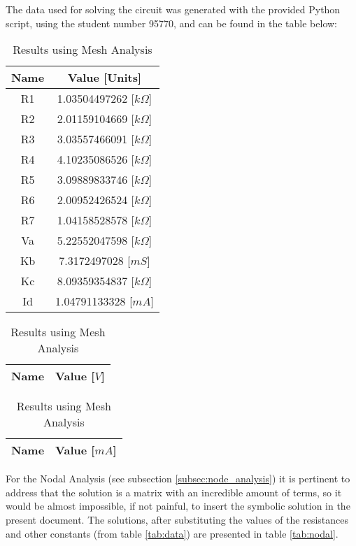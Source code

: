 The data used for solving the circuit was generated with the provided Python script, using the student number 95770, and can be found in the table below:
\begin{table}[h]
\parbox{.36\linewidth}{
  \centering
  \begin{tabular}{|c|c|}
    \hline

    {\bf Name} & {\bf Value [Units]} \\ \hline
    R1 & 1.03504497262 [$k\Omega$]\\ \hline
    R2 & 2.01159104669 [$k\Omega$]\\ \hline
    R3 & 3.03557466091 [$k\Omega$]\\ \hline
    R4 & 4.10235086526 [$k\Omega$]\\ \hline
    R5 & 3.09889833746 [$k\Omega$]\\ \hline
    R6 & 2.00952426524 [$k\Omega$]\\ \hline
    R7 & 1.04158528578 [$k\Omega$]\\ \hline
    Va & 5.22552047598 [$k\Omega$]\\ \hline
    Kb & 7.3172497028 [$mS$]\\ \hline
    Kc & 8.09359354837 [$k\Omega$]\\ \hline
    Id & 1.04791133328 [$mA$]\\ \hline
    
  \end{tabular}
  \caption[Data used]{Data used}
  \label{tab:data}
  }
  \hfill
  \parbox{.25\textwidth}{
  \centering  
  \begin{tabular}{|c|c|}
    \hline    
    {\bf Name} & {\bf Value [$V$]} \\ \hline
    
  \end{tabular}
  \caption[Results using Nodal Analysis]{Results using Nodal Analysis}
  \label{tab:nodal}
  }
  \hfill
  \parbox{0.25\textwidth}{
  \centering
  \begin{tabular}{|c|c|}
    \hline    
    {\bf Name} & {\bf Value [$mA$]} \\ \hline
    
  \end{tabular}
  \caption[Results using Mesh Analysis]{Results using Mesh Analysis}
  \label{tab:mesh}
  }
\end{table}

For the Nodal Analysis (see subsection \ref{subsec:node_analysis}) it is pertinent to address that the solution is a matrix with an incredible amount of terms, so it would be almost impossible, if not painful, to insert the symbolic solution in the present document. The solutions, after substituting the values of the resistances and other constants (from table \ref{tab:data}) are presented in table \ref{tab:nodal}.

